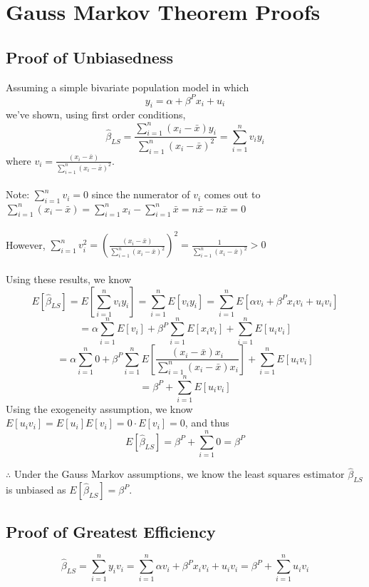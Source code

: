 \documentclass[11pt,letterhead]{article}
\begin{document}
\section{Gauss Markov Theorem Proofs}
\subsection{Proof of Unbiasedness}
Assuming a simple bivariate population model in which $$y_i=\alpha+\beta^Px_i+u_i$$
we've shown, using first order conditions, $$\hat{\beta}_{LS}=\frac{\sum_{i=1}^n (x_i-\bar{x})y_i}{\sum_{i=1}^n(x_i-\bar{x})^2}=\sum_{i=1}^n v_i y_i$$
where $v_i=\frac{(x_i-\bar{x})}{\sum_{i=1}^n (x_i-\bar{x})^2}$.\\~\\
Note: $\sum_{i=1}^n v_i=0$ since the numerator of $v_i$ comes out to $\sum_{i=1}^n (x_i-\bar{x})= \sum_{i=1}^n x_i - \sum_{i=1}^n \bar{x}=n\bar{x}-n\bar{x}=0$\\~\\
However, $\sum_{i=1}^n v_i^2=(\frac{(x_i-\bar{x})}{\sum_{i=1}^n (x_i-\bar{x})^2})^2=\frac{1}{\sum_{i=1}^n (x_i-\bar{x})^2}>0$\\~\\
Using these results, we know $$E[\hat{\beta}_{LS}]=E[\sum_{i=1}^n v_i y_i]=\sum_{i=1}^n E[v_i y_i]=\sum_{i=1}^n E[\alpha v_i + \beta^P x_i v_i+u_i v_i]$$
$$=\alpha \sum_{i=1}^n E[v_i] + \beta^P \sum_{i=1}^n E[x_i v_i]+\sum_{i=1}^n E[u_i v_i]$$
$$=\alpha \sum_{i=1}^n 0 + \beta^P \sum_{i=1}^n E[\frac{(x_i-\bar{x})x_i}{\sum_{i=1}^n(x_i-\bar{x})x_i}]+\sum_{i=1}^n E[u_i v_i]$$
$$=\beta^P+\sum_{i=1}^n E[u_i v_i]$$
Using the exogeneity assumption, we know $E[u_i v_i]=E[u_i]E[v_i]=0\cdot E[v_i]=0$, and thus
$$E[\hat{\beta}_{LS}]=\beta^P+\sum_{i=1}^n 0=\beta^P$$


$\therefore$ Under the Gauss Markov assumptions, we know the least squares estimator $\hat{\beta}_{LS}$ is unbiased as $E[\hat{\beta}_{LS}]=\beta^P$.
\newpage
\subsection{Proof of Greatest Efficiency}
$$\hat{\beta}_{LS}=\sum_{i=1}^n y_i v_i = \sum_{i=1}^n \alpha v_i + \beta^P x_i v_i+u_i v_i= \beta^P + \sum_{i=1}^n u_i v_i$$
\end{document}
